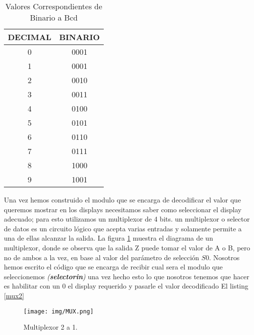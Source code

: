 \documentclass[a4paper]{article}
\begin{document}
\begin{table}[H]
\centering
\begin{tabular}{|c|c|}
\hline
\textbf{DECIMAL} & \textbf{BINARIO} \\ \hline
0                & 0001             \\ \hline
1                & 0001             \\ \hline
2                & 0010             \\ \hline
3                & 0011             \\ \hline
4                & 0100             \\ \hline
5                & 0101             \\ \hline
6                & 0110             \\ \hline
7                & 0111             \\ \hline
8                & 1000             \\ \hline
9                & 1001             \\ \hline
\end{tabular}
\caption{Valores Correspondientes de Binario a Bcd}
\label{binbcd}

\end{table}
Una vez hemos construido el modulo que se encarga de decodificar el valor  que queremos mostrar en los displays necesitamos saber como seleccionar el display adecuado; para esto utilizamos un multiplexor de 4 bits. un multiplexor o selector de datos es un circuito lógico que acepta varias entradas y solamente permite a una de ellas alcanzar la salida. La figura \ref{fig:mux} muestra el diagrama de un multiplexor, donde se observa que la salida Z puede tomar el valor de A o B, pero no de ambos a la vez, en base al valor del parámetro de selección $S0$. Nosotros hemos escrito el código que se encarga de recibir cual sera el modulo que seleccionemos \textit{(\textbf{selectorin})} una vez hecho esto lo que nosotros tenemos que hacer es habilitar con un 0 el display requerido y pasarle el valor decodificado El listing \ref{mux2}
\begin{figure}[H]
  \centering
     \texttt{[image: img/MUX.png]}
  \caption{Multiplexor 2 a 1.}
    \label{fig:mux}
\end{figure}
\end{document}
